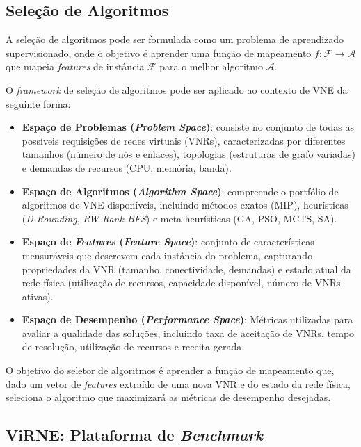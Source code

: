 \documentclass[conference]{IEEEtran}
\begin{document}
\subsection{Seleção de Algoritmos}

A seleção de algoritmos pode ser formulada como um problema de aprendizado supervisionado, onde o objetivo é aprender uma função de mapeamento $f: \mathcal{F} \rightarrow \mathcal{A}$ que mapeia \textit{features} de instância $\mathcal{F}$ para o melhor algoritmo $\mathcal{A}$.

O \textit{framework} de seleção de algoritmos pode ser aplicado ao contexto de VNE da seguinte forma:

\begin{itemize}
    \item \textbf{Espaço de Problemas (\textit{Problem Space})}: consiste no conjunto de todas as possíveis requisições de redes virtuais (VNRs), caracterizadas por diferentes tamanhos (número de nós e enlaces), topologias (estruturas de grafo variadas) e demandas de recursos (CPU, memória, banda).

    \item \textbf{Espaço de Algoritmos (\textit{Algorithm Space})}: compreende o portfólio de algoritmos de VNE disponíveis, incluindo métodos exatos (MIP), heurísticas (\textit{D-Rounding}, \textit{RW-Rank-BFS}) e meta-heurísticas (GA, PSO, MCTS, SA).

    \item \textbf{Espaço de \textit{Features} (\textit{Feature Space})}: conjunto de características mensuráveis que descrevem cada instância do problema, capturando propriedades da VNR (tamanho, conectividade, demandas) e estado atual da rede física (utilização de recursos, capacidade disponível, número de VNRs ativas).

    \item \textbf{Espaço de Desempenho (\textit{Performance Space})}: Métricas utilizadas para avaliar a qualidade das soluções, incluindo taxa de aceitação de VNRs, tempo de resolução, utilização de recursos e receita gerada.
\end{itemize}

O objetivo do seletor de algoritmos é aprender a função de mapeamento que, dado um vetor de \textit{features} extraído de uma nova VNR e do estado da rede física, seleciona o algoritmo que maximizará as métricas de desempenho desejadas.

\subsection{ViRNE: Plataforma de \textit{Benchmark}}\label{subsec:virne:-plataforma-de-benchmark}
\end{document}
